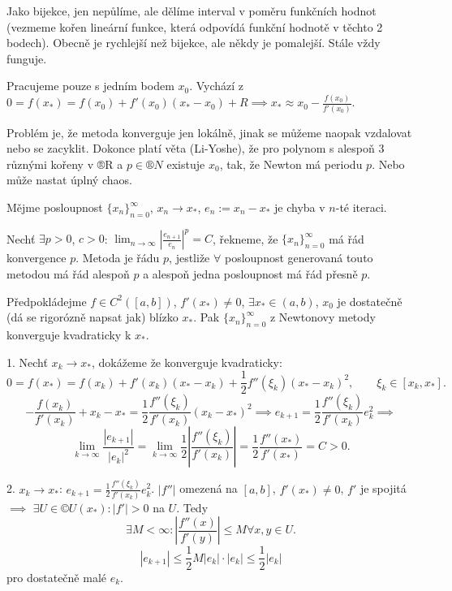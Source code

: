 \documentclass[12pt]{article}					%
\begin{document}
\begin{definice}
	Jako bijekce, jen nepůlíme, ale dělíme interval v poměru funkčních hodnot (vezmeme kořen lineární funkce, která odpovídá funkční hodnotě v těchto 2 bodech). Obecně je rychlejší než bijekce, ale někdy je pomalejší. Stále vždy funguje.
\end{definice}

\begin{definice}
	Pracujeme pouze s jedním bodem $x_0$. Vychází z $0 = f(x_*) = f(x_0) + f'(x_0)(x_* - x_0) + R \implies x_* \approx x_0 - \frac{f(x_0)}{f'(x_0)}$.

	Problém je, že metoda konverguje jen lokálně, jinak se můžeme naopak vzdalovat nebo se zacyklit. Dokonce platí věta (Li-Yoshe), že pro polynom s alespoň 3 různými kořeny v ®R a $p \in ®N$ existuje $x_0$, tak, že Newton má periodu $p$. Nebo může nastat úplný chaos.
\end{definice}

\begin{definice}
	Mějme posloupnost $\{x_n\}_{n=0}^∞$, $x_n \rightarrow x_*$, $e_n := x_n - x_*$ je chyba v $n$-té iteraci.

	Nechť $\exists p > 0$, $c > 0$: $\lim_{n \rightarrow ∞} |\frac{e_{n+1}}{e_n}|^p = C$, řekneme, že $\{x_n\}_{n=0}^∞$ má řád konvergence $p$. Metoda je řádu $p$, jestliže $\forall$ posloupnost generovaná touto metodou má řád alespoň $p$ a alespoň jedna posloupnost má řád přesně $p$.
\end{definice}

\begin{veta}
	Předpokládejme $f \in C^2([a, b])$, $f'(x_*) ≠ 0$, $\exists x_* \in (a, b)$, $x_0$ je dostatečně (dá se rigorózně napsat jak) blízko $x_*$. Pak $\{x_n\}_{n=0}^∞$ z Newtonovy metody konverguje kvadraticky k $x_*$.

	\begin{dukazin}
		1. Nechť $x_k \rightarrow x_*$, dokážeme že konverguje kvadraticky:
		$$ 0 = f(x_*) = f(x_k) + f'(x_k)(x_* - x_k) + \frac{1}{2}f''(\xi_k)(x_* - x_k)^2, \qquad \xi_k \in [x_k, x_*]. $$
		$$ - \frac{f(x_k)}{f'(x_k)} + x_k - x_* = \frac{1}{2} \frac{f''(\xi_k)}{f'(x_k)} (x_k - x_*)^2 \implies e_{k+1} = \frac{1}{2} \frac{f''(\xi_k)}{f'(x_k)} e_k^2 \implies $$
		$$ \lim_{k \rightarrow ∞} \frac{|e_{k+1}|}{|e_k|^2} = \lim_{k \rightarrow ∞} \frac{1}{2} |\frac{f''(\xi_k)}{f'(x_k)}| = \frac{1}{2} \frac{f''(x_*)}{f'(x_*)} = C > 0. $$

		2. $x_k \rightarrow x_*$: $e_{k+1} = \frac{1}{2} \frac{f''(\xi_k)}{f'(x_k)} e^2_k$. $|f''|$ omezená na $[a, b]$, $f'(x_*) ≠ 0$, $f'$ je spojitá $\implies$ $\exists U \in ©U(x_*): |f'| > 0$ na $U$. Tedy 
		$$ \exists M < ∞: |\frac{f''(x)}{f'(y)}| ≤ M \forall x, y \in U. $$
		$$ |e_{k+1}| ≤ \frac{1}{2} M |e_k|·|e_k| ≤ \frac{1}{2}|e_k| $$
		pro dostatečně malé $e_k$.
	\end{dukazin}
\end{veta}
\end{document}
